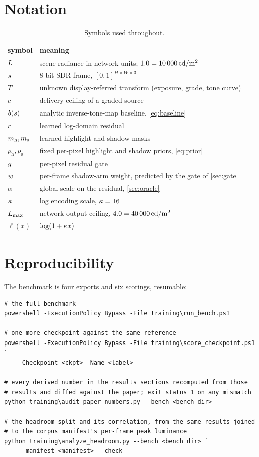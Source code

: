 \section{Notation}
\label{sec:notation}

\begin{table}[htbp]
\centering
\caption{Symbols used throughout.}
\label{tab:notation}
\begin{tabular}{ll}
\toprule
symbol & meaning \\
\midrule
$L$ & scene radiance in network units; $1.0 = \SI{10000}{\ensuremath{\mathrm{cd/m^2}}}$ \\
$s$ & 8-bit SDR frame, $[0,1]^{H\times W\times 3}$ \\
$T$ & unknown display-referred transform (exposure, grade, tone curve) \\
$c$ & delivery ceiling of a graded source \\
$b(s)$ & analytic inverse-tone-map baseline, \cref{eq:baseline} \\
$r$ & learned log-domain residual \\
$m_{\mathrm{h}}, m_{\mathrm{s}}$ & learned highlight and shadow masks \\
$p_{\mathrm{h}}, p_{\mathrm{s}}$ & fixed per-pixel highlight and shadow priors, \cref{eq:prior} \\
$g$ & per-pixel residual gate \\
$w$ & per-frame shadow-arm weight, predicted by the gate of \cref{sec:gate} \\
$\alpha$ & global scale on the residual, \cref{sec:oracle} \\
$\kappa$ & log encoding scale, $\kappa = 16$ \\
$L_{\max}$ & network output ceiling, $4.0 = \SI{40000}{\ensuremath{\mathrm{cd/m^2}}}$ \\
$\ell(x)$ & $\log(1 + \kappa x)$ \\
\bottomrule
\end{tabular}
\end{table}

\section{Reproducibility}
\label{sec:reproducibility}

The benchmark is four exports and six scorings, resumable:

\begin{Verbatim}[fontsize=\small]
# the full benchmark
powershell -ExecutionPolicy Bypass -File training\run_bench.ps1

# one more checkpoint against the same reference
powershell -ExecutionPolicy Bypass -File training\score_checkpoint.ps1 `
    -Checkpoint <ckpt> -Name <label>

# every derived number in the results sections recomputed from those
# results and diffed against the paper; exit status 1 on any mismatch
python training\audit_paper_numbers.py --bench <bench dir>

# the headroom split and its correlation, from the same results joined
# to the corpus manifest's per-frame peak luminance
python training\analyze_headroom.py --bench <bench dir> `
    --manifest <manifest> --check
\end{Verbatim}

